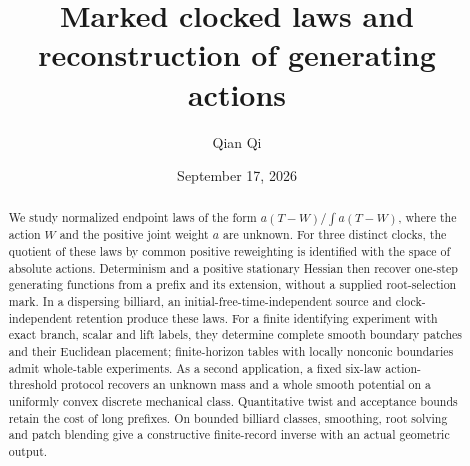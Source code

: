 
\title[Marked clocked laws and generating actions]{Marked clocked laws and reconstruction of generating actions}
\author{Qian Qi}
\date{September 17, 2026}

\begin{abstract}
We study normalized endpoint laws of the form $a(T-W)/\int a(T-W)$,
where the action $W$ and the positive joint weight $a$ are unknown.
For three distinct clocks, the quotient of these laws by common positive
reweighting is identified with the space of absolute actions.  Determinism
and a positive stationary Hessian then recover one-step generating
functions from a prefix and its extension, without a supplied root-selection
mark.  In a dispersing billiard, an initial-free-time-independent source
and clock-independent retention produce these laws.  For a finite
identifying experiment with exact branch, scalar and lift labels, they
determine complete smooth boundary patches and their Euclidean placement;
finite-horizon tables with locally nonconic boundaries admit whole-table
experiments.  As a second application, a fixed six-law action-threshold
protocol recovers an unknown mass and a whole smooth potential on a
uniformly convex discrete mechanical class.  Quantitative twist and
acceptance bounds retain the cost of long prefixes.  On bounded billiard
classes, smoothing, root solving and patch blending give a constructive
finite-record inverse with an actual geometric output.
\end{abstract}
\maketitle
\setcounter{tocdepth}{1}
\tableofcontents











